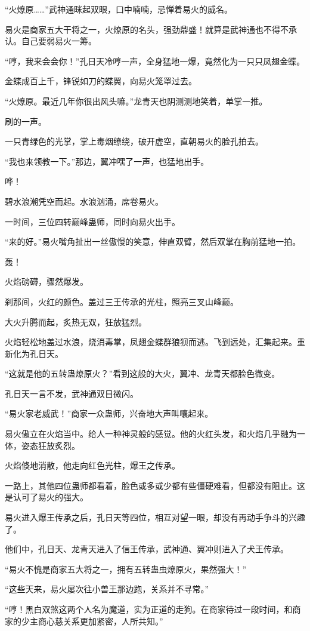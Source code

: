 \begin{this_body}
“火燎原……”武神通眯起双眼，口中喃喃，忌惮着易火的威名。

易火是商家五大干将之一，火燎原的名头，强劲鼎盛！就算是武神通也不得不承认。自己要弱易火一筹。

“哼，我来会会你！”孔日天冷哼一声，全身猛地一爆，竟然化为一只只凤翅金蝶。

金蝶成百上千，锋锐如刀的蝶翼，向易火笼罩过去。

“火燎原。最近几年你很出风头嘛。”龙青天也阴测测地笑着，单掌一推。

刷的一声。

一只青绿色的光掌，掌上毒烟缭绕，破开虚空，直朝易火的脸孔拍去。

“我也来领教一下。”那边，翼冲嘿了一声，也猛地出手。

哗！

碧水浪潮凭空而起。水浪汹涌，席卷易火。

一时间，三位四转巅峰蛊师，同时向易火出手。

“来的好。”易火嘴角扯出一丝傲慢的笑意，伸直双臂，然后双掌在胸前猛地一拍。

轰！

火焰磅礴，骤然爆发。

刹那间，火红的颜色。盖过三王传承的光柱，照亮三叉山峰巅。

大火升腾而起，炙热无双，狂放猛烈。

火焰轻松地盖过水浪，烧消毒掌，凤翅金蝶群狼狈而逃。飞到远处，汇集起来。重新化为孔日天。

“这就是他的五转蛊燎原火？”看到这般的大火，翼冲、龙青天都脸色微变。

孔日天一言不发，武神通双目微闪。

“易火家老威武！”商家一众蛊师，兴奋地大声叫嚷起来。

易火傲立在火焰当中。给人一种神灵般的感觉。他的火红头发，和火焰几乎融为一体，姿态狂放炙烈。

火焰倏地消散，他走向红色光柱，爆王之传承。

一路上，其他四位蛊师都看着，脸色或多或少都有些僵硬难看，但都没有阻止。这是认可了易火的强大。

易火进入爆王传承之后，孔日天等四位，相互对望一眼，却没有再动手争斗的兴趣了。

他们中，孔日天、龙青天进入了信王传承，武神通、翼冲则进入了犬王传承。

“易火不愧是商家五大将之一，拥有五转蛊虫燎原火，果然强大！”

“这些天来，易火屡次往小兽王那边跑，关系并不寻常。”

“哼！黑白双煞这两个人名为魔道，实为正道的走狗。在商家待过一段时间，和商家的少主商心慈关系更加紧密，人所共知。”


\end{this_body}
